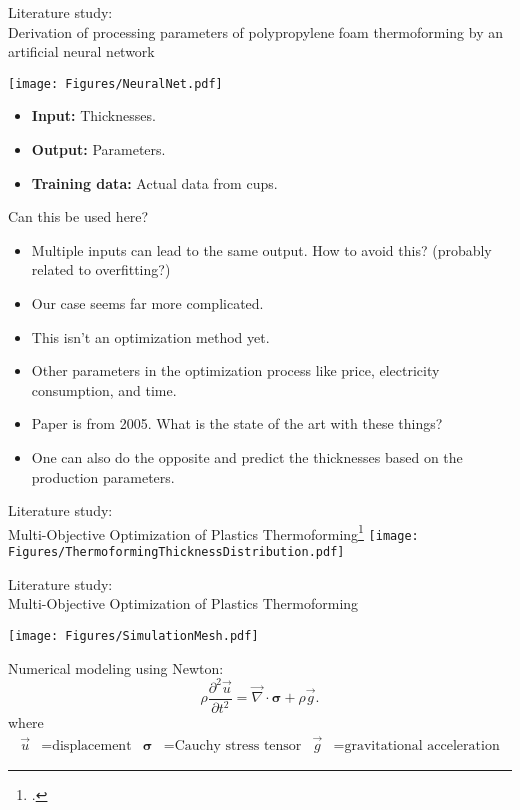 \documentclass{beamer}
\begin{document}
	\begin{frame}{Literature study:\\Derivation of processing parameters of polypropylene foam thermoforming by an artificial neural network}
		\begin{center}
			\texttt{[image: Figures/NeuralNet.pdf]}
		\end{center}
		\begin{itemize}
			\item \textbf{Input:} Thicknesses.
			\item \textbf{Output:} Parameters.
			\item \textbf{Training data:} Actual data from cups.
		\end{itemize}
	\end{frame}

	\begin{frame}{Can this be used here?}
		\begin{itemize}
			\item Multiple inputs can lead to the same output. How to avoid this? (probably related to overfitting?)
			\pause
			\item Our case seems far more complicated.
			\pause
			\item This isn't an optimization method yet.
			\pause
			\item Other parameters in the optimization process like price, electricity consumption, and time.
			\pause
			\item Paper is from 2005. What is the state of the art with these things?
			\pause
			\item One can also do the opposite and predict the thicknesses based on the production parameters.
		\end{itemize}
	\end{frame}

	\begin{frame}{Literature study:\\ Multi-Objective Optimization of Plastics Thermoforming\footcite{math9151760}}
		\centering
		\texttt{[image: Figures/ThermoformingThicknessDistribution.pdf]}
	\end{frame}

	\begin{frame}{Literature study:\\ Multi-Objective Optimization of Plastics Thermoforming}
		\begin{center}
			\texttt{[image: Figures/SimulationMesh.pdf]}
		\end{center}
		Numerical modeling using Newton:
		\[\rho\frac{\partial^2\vec{u}}{\partial t^2}=\vec{\nabla}\cdot \boldsymbol{\sigma}+\rho \vec{g}.\]
	where
	\begin{align*}
		\vec{u}&=\text{displacement}&\boldsymbol{\sigma}&=\text{Cauchy stress tensor}&\vec{g}&=\text{gravitational acceleration}
	\end{align*}
	\end{frame}
\end{document}
